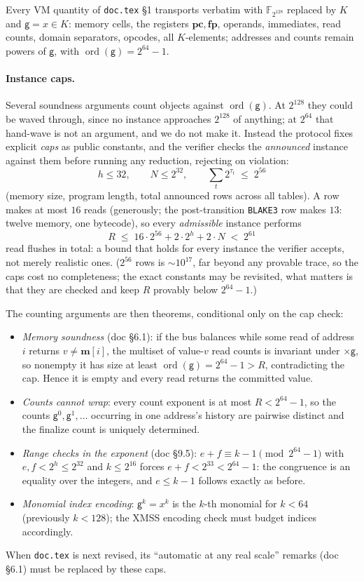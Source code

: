 \documentclass[11pt]{article}
\newcommand{\F}{\mathbb{F}}
\newcommand{\K}{K}            %
\newcommand{\gen}{\mathsf{g}}
\begin{document}
Every VM quantity of \texttt{doc.tex} \S1 transports verbatim with
$\F_{2^{128}}$ replaced by $\K$ and $\gen=x\in\K$:
memory cells, the registers $\mathbf{pc},\mathbf{fp}$, operands, immediates,
read counts, domain separators, opcodes, all $\K$-elements; addresses and
counts remain powers of $\gen$, with $\operatorname{ord}(\gen)=2^{64}-1$.

\paragraph{Instance caps.}\label{sec:caps}
Several soundness arguments count objects against
$\operatorname{ord}(\gen)$. At $2^{128}$ they could be waved through,
since no instance approaches $2^{128}$ of anything; at $2^{64}$ that
hand-wave is not an argument, and we do not make it. Instead the protocol
fixes explicit \emph{caps} as public constants, and the verifier checks the
\emph{announced} instance against them before running any reduction,
rejecting on violation:
\[
  h\le 32,\qquad N\le 2^{32},\qquad \sum_{t}2^{\tau_t}\;\le\;2^{56}
\]
(memory size, program length, total announced rows across all tables). A
row makes at most $16$ reads (generously; the post-transition
\texttt{BLAKE3} row makes $13$: twelve memory, one bytecode), so every
\emph{admissible} instance performs
\[
  R\;\le\;16\cdot 2^{56}+2\cdot 2^{h}+2\cdot N\;<\;2^{61}
\]
read flushes in total: a bound that holds for every instance the
verifier accepts, not merely realistic ones. ($2^{56}$ rows is
$\sim\!10^{17}$, far beyond any provable trace, so the caps cost no
completeness; the exact constants may be revisited, what matters is that
they are checked and keep $R$ provably below $2^{64}-1$.)

The counting arguments are then theorems, conditional only on the cap
check:
\begin{itemize}
\item \emph{Memory soundness} (doc \S6.1): if the bus balances while some
  read of address $i$ returns $v\neq\mathbf{m}[i]$, the multiset of
  value-$v$ read counts is invariant under $\times\gen$, so nonempty it has
  size at least $\operatorname{ord}(\gen)=2^{64}-1>R$, contradicting the
  cap. Hence it is empty and every read returns the committed value.
\item \emph{Counts cannot wrap}: every count exponent is at most
  $R<2^{64}-1$, so the counts $\gen^{0},\gen^{1},\dots$ occurring in one
  address's history are pairwise distinct and the finalize count is
  uniquely determined.
\item \emph{Range checks in the exponent} (doc \S9.5): $e+f\equiv k-1
  \pmod{2^{64}-1}$ with $e,f<2^{h}\le2^{32}$ and $k\le 2^{16}$ forces
  $e+f<2^{33}<2^{64}-1$: the congruence is an equality over the integers,
  and $e\le k-1$ follows exactly as before.
\item \emph{Monomial index encoding}: $\gen^k=x^k$ is the $k$-th monomial for
  $k<64$ (previously $k<128$); the XMSS encoding check must budget indices
  accordingly.
\end{itemize}
When \texttt{doc.tex} is next revised, its ``automatic at any real
scale'' remarks (doc \S6.1) must be replaced by these caps.
\end{document}
